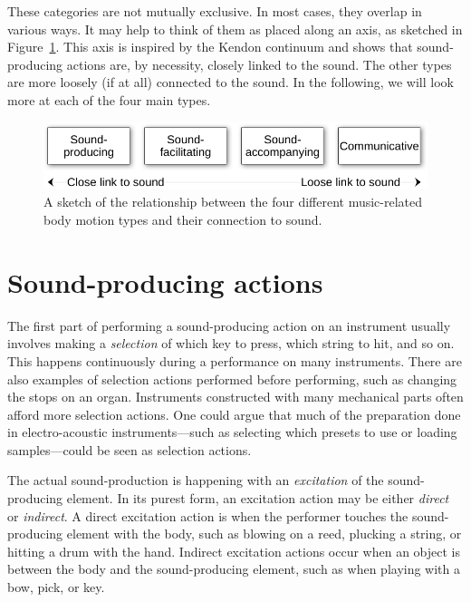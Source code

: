 These categories are not mutually exclusive. In most cases, they overlap in various ways. It may help to think of them as placed along an axis, as sketched in Figure~\ref{fig:action-link-sound}. This axis is inspired by the Kendon continuum \citep{mcneill_hand_1992} and shows that sound-producing actions are, by necessity, closely linked to the sound. The other types are more loosely (if at all) connected to the sound. In the following, we will look more at each of the four main types.

\begin{figure}[tbp]
\includegraphics[width=\columnwidth]{figures/25-sound-link-crop.pdf}
\caption{A sketch of the relationship between the four different music-related body motion types and their connection to sound.}
\label{fig:action-link-sound}
\end{figure}


\section{Sound-producing actions}\label{sec:sound-producing-actions}

The first part of performing a sound-producing action on an instrument usually involves making a \emph{selection} of which key to press, which string to hit, and so on. This happens continuously during a performance on many instruments. There are also examples of selection actions performed before performing, such as changing the stops on an organ. Instruments constructed with many mechanical parts often afford more selection actions. One could argue that much of the preparation done in electro-acoustic instruments---such as selecting which presets to use or loading samples---could be seen as selection actions.

The actual sound-production is happening with an \emph{excitation} of the sound-producing element. In its purest form, an excitation action may be either \emph{direct} or \emph{indirect}. A direct excitation action is when the performer touches the sound-producing element with the body, such as blowing on a reed, plucking a string, or hitting a drum with the hand. Indirect excitation actions occur when an object is between the body and the sound-producing element, such as when playing with a bow, pick, or key.


